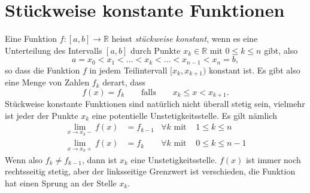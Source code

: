 %
%
%
\section{Stückweise konstante Funktionen%
\label{section:stueckweise}}
Eine Funktion $f\colon[a,b]\to\mathbb R$ heisst {\em stückweise konstant},
wenn es eine Unterteilung des Intervalls $[a,b]$ durch Punkte
%
$x_k\in\mathbb R$ mit $0\le k\le n$ gibt, also
\[
a=x_0 < x_1 < \dots < x_k < \dots < x_{n-1} < x_n = b,
\]
so dass die Funktion $f$ in jedem Teilintervall $[x_k,x_{k+1})$
konstant ist.
Es gibt also eine Menge von Zahlen $f_k$ derart, dass
\begin{equation}
f(x)
=
f_k
\qquad\text{falls}\qquad
x_k \le x < x_{k+1}.
\label{buch:stückweisef}
\end{equation}
Stückweise konstante Funktionen sind natürlich nicht überall stetig sein,
vielmehr ist jeder der Punkte $x_k$ eine potentielle Unstetigkeitsstelle.
Es gilt nämlich
\begin{equation*}
\begin{aligned}
\lim_{x\to x_k-} f(x)
&=
f_{k-1}&\forall k\text{ mit }&1\le k \le n
\\
\lim_{x\to x_k+} f(x)
&=
f_k&\forall k\text{ mit }&0\le k \le n-1
\end{aligned}
\end{equation*}
Wenn also $f_k\ne f_{k-1}$, dann ist $x_k$ eine Unstetigkeitsstelle.
$f(x)$ ist immer noch rechtsseitig stetig, aber der linksseitige
Grenzwert ist verschieden, die Funktion hat einen Sprung an der
Stelle $x_k$.

